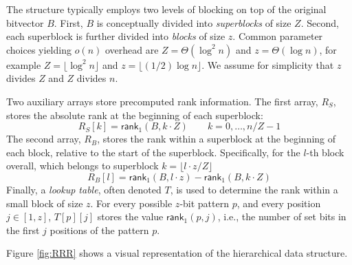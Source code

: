 The structure typically employs two levels of blocking on top of the original bitvector $B$. First, $B$ is conceptually divided into \emph{superblocks} of size $Z$. Second, each superblock is further divided into \emph{blocks} of size $z$. Common parameter choices yielding $o(n)$ overhead are $Z = \Theta(\log^2 n)$ and $z = \Theta(\log n)$, for example $Z = \lfloor \log^2 n \rfloor$ and $z = \lfloor (1/2) \log n \rfloor$. We assume for simplicity that $z$ divides $Z$ and $Z$ divides $n$.

Two auxiliary arrays store precomputed rank information. The first array, $R_S$, stores the absolute rank at the beginning of each superblock:
\begin{equation*}
    R_S[k] = \textsf{rank}_1(B, k \cdot Z) \qquad k = 0, \dots, n/Z - 1
\end{equation*}
The second array, $R_B$, stores the rank within a superblock at the beginning of each block, relative to the start of the superblock. Specifically, for the $l$-th block overall, which belongs to superblock $k = \lfloor l \cdot z / Z \rfloor$
\begin{equation*}
    R_B[l] = \textsf{rank}_1(B, l \cdot z) - \textsf{rank}_1(B, k \cdot Z)
\end{equation*}
Finally, a \emph{lookup table}, often denoted $T$, is used to determine the rank within a small block of size $z$. For every possible $z$-bit pattern $p$, and every position $j \in [1, z]$, $T[p][j]$ stores the value $\textsf{rank}_1(p, j)$, i.e., the number of set bits in the first $j$ positions of the pattern $p$.

Figure \ref{fig:RRR} shows a visual representation of the hierarchical data structure.

